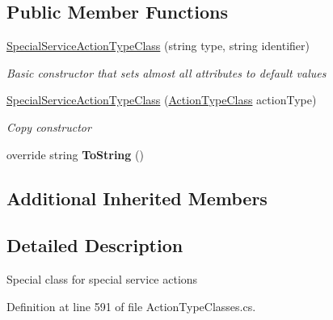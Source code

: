 \subsection*{Public Member Functions}
\begin{DoxyCompactItemize}
\item 
\hyperlink{class_general_health_care_elements_1_1_general_classes_1_1_action_types_and_paths_1_1_special_service_action_type_class_acdce5ea9c7b52e5e3c3451365bc31060}{Special\+Service\+Action\+Type\+Class} (string type, string identifier)
\begin{DoxyCompactList}\small\item\em Basic constructor that sets almost all attributes to default values \end{DoxyCompactList}\item 
\hyperlink{class_general_health_care_elements_1_1_general_classes_1_1_action_types_and_paths_1_1_special_service_action_type_class_a3d2b6f615e2d15c046981c367dbe9565}{Special\+Service\+Action\+Type\+Class} (\hyperlink{class_general_health_care_elements_1_1_general_classes_1_1_action_types_and_paths_1_1_action_type_class}{Action\+Type\+Class} action\+Type)
\begin{DoxyCompactList}\small\item\em Copy constructor \end{DoxyCompactList}\item 
override string {\bfseries To\+String} ()\hypertarget{class_general_health_care_elements_1_1_general_classes_1_1_action_types_and_paths_1_1_special_service_action_type_class_a930e9f0886404a00a8616549a2ebcafd}{}\label{class_general_health_care_elements_1_1_general_classes_1_1_action_types_and_paths_1_1_special_service_action_type_class_a930e9f0886404a00a8616549a2ebcafd}

\end{DoxyCompactItemize}
\subsection*{Additional Inherited Members}


\subsection{Detailed Description}
Special class for special service actions 



Definition at line 591 of file Action\+Type\+Classes.\+cs.



